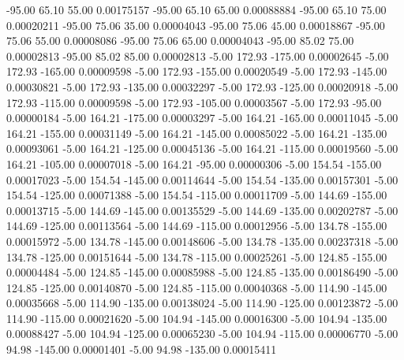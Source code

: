     -95.00     65.10     55.00     0.00175157
    -95.00     65.10     65.00     0.00088884
    -95.00     65.10     75.00     0.00020211
    -95.00     75.06     35.00     0.00004043
    -95.00     75.06     45.00     0.00018867
    -95.00     75.06     55.00     0.00008086
    -95.00     75.06     65.00     0.00004043
    -95.00     85.02     75.00     0.00002813
    -95.00     85.02     85.00     0.00002813
     -5.00    172.93   -175.00     0.00002645
     -5.00    172.93   -165.00     0.00009598
     -5.00    172.93   -155.00     0.00020549
     -5.00    172.93   -145.00     0.00030821
     -5.00    172.93   -135.00     0.00032297
     -5.00    172.93   -125.00     0.00020918
     -5.00    172.93   -115.00     0.00009598
     -5.00    172.93   -105.00     0.00003567
     -5.00    172.93    -95.00     0.00000184
     -5.00    164.21   -175.00     0.00003297
     -5.00    164.21   -165.00     0.00011045
     -5.00    164.21   -155.00     0.00031149
     -5.00    164.21   -145.00     0.00085022
     -5.00    164.21   -135.00     0.00093061
     -5.00    164.21   -125.00     0.00045136
     -5.00    164.21   -115.00     0.00019560
     -5.00    164.21   -105.00     0.00007018
     -5.00    164.21    -95.00     0.00000306
     -5.00    154.54   -155.00     0.00017023
     -5.00    154.54   -145.00     0.00114644
     -5.00    154.54   -135.00     0.00157301
     -5.00    154.54   -125.00     0.00071388
     -5.00    154.54   -115.00     0.00011709
     -5.00    144.69   -155.00     0.00013715
     -5.00    144.69   -145.00     0.00135529
     -5.00    144.69   -135.00     0.00202787
     -5.00    144.69   -125.00     0.00113564
     -5.00    144.69   -115.00     0.00012956
     -5.00    134.78   -155.00     0.00015972
     -5.00    134.78   -145.00     0.00148606
     -5.00    134.78   -135.00     0.00237318
     -5.00    134.78   -125.00     0.00151644
     -5.00    134.78   -115.00     0.00025261
     -5.00    124.85   -155.00     0.00004484
     -5.00    124.85   -145.00     0.00085988
     -5.00    124.85   -135.00     0.00186490
     -5.00    124.85   -125.00     0.00140870
     -5.00    124.85   -115.00     0.00040368
     -5.00    114.90   -145.00     0.00035668
     -5.00    114.90   -135.00     0.00138024
     -5.00    114.90   -125.00     0.00123872
     -5.00    114.90   -115.00     0.00021620
     -5.00    104.94   -145.00     0.00016300
     -5.00    104.94   -135.00     0.00088427
     -5.00    104.94   -125.00     0.00065230
     -5.00    104.94   -115.00     0.00006770
     -5.00     94.98   -145.00     0.00001401
     -5.00     94.98   -135.00     0.00015411
